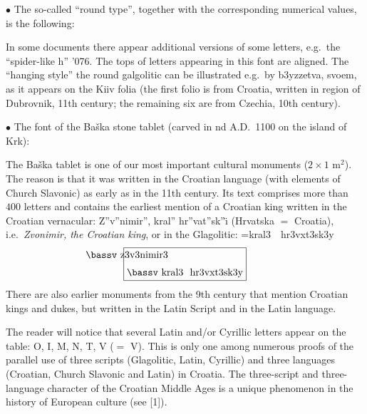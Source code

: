 \noindent$\bullet$  The so-called ``round type'', together
with the corresponding numerical values, is the following:



\noindent In some documents there appear  additional
versions of some letters,
e.g.\ the ``spider-like h'' {\obl\char'076}. The
tops of letters appearing in this font are aligned. The
``hanging style'' the round galgolitic can be illustrated
e.g.\ by
{\obl b3yzzetva}, {\obl svoem}, as it appears on the Kiiv folia
(the first folio
is from Croatia, written in region of  Dubrovnik, 11th century;
 the remaining six are from Czechia, 10th century).

\medskip

\noindent$\bullet$ The font of the Ba\v ska stone tablet
(carved in nd A.D.\
1100  on the island of Krk):




The Ba\v ska tablet is one of our most important cultural
monuments  ($2\times 1$ m${}^2$). The reason is that it was
written in the Croatian
language (with elements of Church Slavonic) as early as
in the 11th century.  Its text comprises more than $400$
letters and  contains the earliest
mention of a Croatian king written in the Croatian
vernacular: Z''v''nimir'', kral'' hr''vat''sk''\"{\i}
(Hrvatska $=$ Croatia), i.e.\
{\it Zvonimir, the Croatian king\/}, or in the
Glagolitic:
=\hbox{\bassv kral3 \ hr3vxt3sk3y}
$$
\okkvir36{\hbox to \wd0{\hss\bassv z3v3nimir3\hss}
\vskip2mm
\hbox{\bassv kral3 \ hr3vxt3sk3y}}
$$
There are also earlier  monuments from the 9th century that
mention Croatian kings and dukes, but written in the Latin
Script and in the Latin
language.

The reader will notice that several Latin and/or Cyrillic
letters appear on the table: {\bass O, I, M, N, T, V} ($=$
V)\null. This
is only one among numerous proofs of the parallel use of three
scripts (Glagolitic, Latin, Cyrillic) and three languages
(Croatian, Church Slavonic and Latin) in Croatia. The
three-script and three-language character of the
Croatian Middle Ages is a unique phenomenon in the history of
European culture (see [1]).

